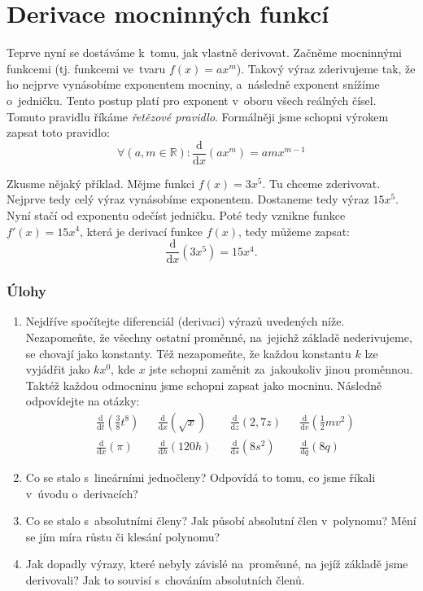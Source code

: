 \vfill{}
\pagebreak
\section{Derivace mocninných funkcí}

Teprve nyní se dostáváme k~tomu, jak vlastně derivovat. Začněme mocninnými funkcemi (tj. funkcemi ve~tvaru $f(x) = ax^m$). Takový výraz zderivujeme tak, že ho nejprve vynásobíme exponentem mocniny, a~následně exponent snížíme o~jedničku. Tento postup platí pro exponent v~oboru všech reálných čísel. Tomuto pravidlu říkáme \emph{řetězové pravidlo}. Formálněji jsme schopni výrokem zapsat toto pravidlo:
\begin{equation*}
    \forall (a, m \in \mathbb{R}):
    \frac{\text{d}}{\text{d}x}\left(ax^m\right) = amx^{m - 1}
\end{equation*}

Zkusme nějaký příklad. Mějme funkci $f(x) = 3x^5$. Tu chceme zderivovat. Nejprve tedy celý výraz vynásobíme exponentem. Dostaneme tedy výraz $15x^5$. Nyní stačí od exponentu odečíst jedničku. Poté tedy vznikne funkce $f'(x) = 15x^4$, která je derivací funkce $f(x)$, tedy můžeme zapsat:
\begin{equation*}
    \frac{\text{d}}{\text{d}x} \left( 3x^5 \right) = 15x^4.
\end{equation*}

\subsubsection*{Úlohy}
\begin{enumerate}
    \item Nejdříve spočítejte diferenciál (derivaci) výrazů uvedených níže. Nezapomeňte, že všechny ostatní proměnné, na~jejichž základě nederivujeme, se chovají jako konstanty. Též nezapomeňte, že každou konstantu $k$ lze vyjádřit jako $kx^0$, kde $x$ jste schopni zaměnit za~jakoukoliv jinou proměnnou. Taktéž každou odmocninu jsme schopni zapsat jako mocninu. Následně odpovídejte na otázky:
    \begin{align*}
        &\frac{\text{d}}{\text{d}t} \left( \frac38 t^8 \right) &
        &\frac{\text{d}}{\text{d}x} \left( \sqrt{x} \right) &
        &\frac{\text{d}}{\text{d}z} \left( 2,7z \right) &
        &\frac{\text{d}}{\text{d}v} \left( \frac12 mv^2 \right) \\
        &\frac{\text{d}}{\text{d}x} \left( \pi \right) &
        &\frac{\text{d}}{\text{d}h} \left( 120h \right) &
        &\frac{\text{d}}{\text{d}s} \left( 8s^2 \right) &
        &\frac{\text{d}}{\text{d}q} \left( 8q \right)
    \end{align*}

    \item Co se stalo s~lineárními jednočleny? Odpovídá to tomu, co jsme říkali v~úvodu o~derivacích?
    \item Co se stalo s~absolutními členy? Jak působí absolutní člen v~polynomu? Mění se jím míra růstu či klesání polynomu?
    \item Jak dopadly výrazy, které nebyly závislé na~proměnné, na jejíž základě jsme derivovali? Jak to souvisí s~chováním absolutních členů.
\end{enumerate}

